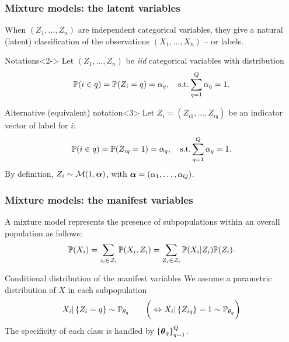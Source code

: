 \documentclass{beamer}\usepackage[]{graphicx}\usepackage[]{color}
\begin{document}
\begin{frame}
  \frametitle{Mixture models: the latent variables}

    When $(Z_1,\dots,Z_n)$ are independent categorical variables, they give a \alert{natural (latent) classification of the observations} $(X_1,\dots,X_n)$ -- or \alert{labels}.

  \begin{block}{Notations}<2->
    Let $(Z_1, \dots, Z_n)$ be \textit{iid} categorical variables with distribution
    \vspace{-.25cm}
    \begin{equation*}
      \mathbb{P}(i \in q) = \mathbb{P}(Z_i = q) = \alpha_q, \quad \text{s.t.}  \sum_{q=1}^Q \alpha_q = 1.
    \end{equation*}
  \end{block}

  \vspace{-.5cm}
  \begin{block}{Alternative (equivalent) notation}<3>
    Let $Z_i=(Z_{i1},\dots, Z_{iq})$ be an indicator vector of label for $i$:
    \vspace{-.25cm}
    \begin{equation*}
      \mathbb{P}(i \in q) = \mathbb{P}(Z_{iq}  =  1)=\alpha_q,  \quad  \text{s.t.} \sum_{q=1}^Q \alpha_q = 1.
    \end{equation*}
    By definition, $Z_i \sim \mathcal{M}(1, \boldsymbol\alpha)$, with $\boldsymbol\alpha = (\alpha_1, \dots, \alpha_Q)$.
  \end{block}

\end{frame}

\begin{frame}
  \frametitle{Mixture models: the manifest variables}

  A mixture model represents the \alert{presence of subpopulations} within an overall population as follows:
  \begin{equation*}
    \mathbb{P}(X_i) = \sum_{z_i \in \mathcal{Z}_i} \mathbb{P}(X_i , Z_i) = \sum_{Z_i \in \mathcal{Z}_i}\mathbb{P}(X_i | Z_i) \mathbb{P}(Z_i).
  \end{equation*}

  \vfill

  \begin{block}{Conditional distribution of the manifest variables}
    We assume a \alert{parametric distribution} of $X$ in each subpopulation
    \begin{equation*}
      X_i | \left\{Z_i = q\right\} \sim \mathbb{P}_{\theta_q} \qquad \bigg(\Leftrightarrow X_i | \left\{Z_{iq}\right\} = 1 \sim \mathbb{P}_{\theta_q}\bigg)
    \end{equation*}
    The specificity of each class is handled by $\left\{\boldsymbol\theta_q\right\}_{q=1}^Q$.
  \end{block}

\end{frame}
\end{document}
